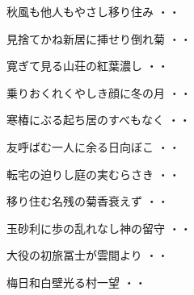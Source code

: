 \begin{shiika}秋風も他人もやさし移り住み
\hfill{・・}\end{shiika}
\vspace{0.6cm}
\begin{shiika}見捨てかね新居に挿せり倒れ菊
\hfill{・・}\end{shiika}
\vspace{0.6cm}
\begin{shiika}寛ぎて見る山荘の紅葉濃し
\hfill{・・}\end{shiika}
\vspace{0.6cm}
\begin{shiika}乗りおくれくやしき顔に冬の月
\hfill{・・}\end{shiika}
\vspace{0.6cm}
\begin{shiika}寒椿にぶる起ち居のすべもなく
\hfill{・・}\end{shiika}
\vspace{0.6cm}
\begin{shiika}友呼ばむ一人に余る日向ぼこ
\hfill{・・}\end{shiika}
\vspace{0.6cm}
\begin{shiika}転宅の迫りし庭の実むらさき
\hfill{・・}\end{shiika}
\vspace{0.6cm}
\begin{shiika}移り住む名残の菊香衰えず
\hfill{・・}\end{shiika}
\vspace{0.6cm}
\begin{shiika}玉砂利に歩の乱れなし神の留守
\hfill{・・}\end{shiika}
\vspace{0.6cm}
\begin{shiika}大役の初旅冨士が雲間より
\hfill{・・}\end{shiika}
\vspace{0.6cm}
\begin{shiika}梅日和白壁光る村一望
\hfill{・・}\end{shiika}
\vspace{0.6cm}
